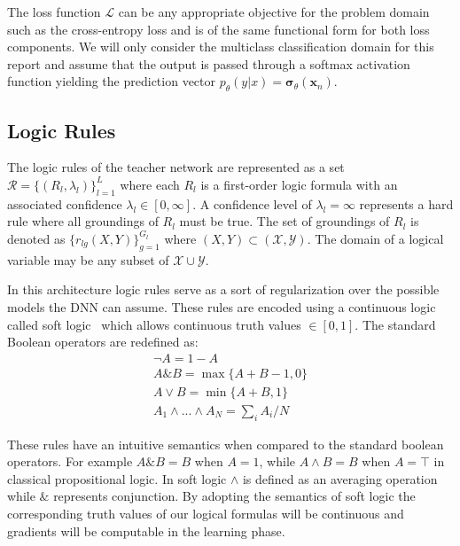 \documentclass[11pt]{article}
\begin{document}
The loss function $\mathcal{L}$ can be any appropriate objective for the problem domain such as the cross-entropy loss and is of the same functional form for both loss components.  We will only consider the multiclass classification domain for this report and assume that the output is passed through a softmax activation function yielding the prediction vector $p_\theta(y|x) = \boldsymbol{\sigma}_{\theta}(\textbf{x}_{n})$.

\subsection{Logic Rules}
The logic rules of the teacher network are represented as a set $\mathcal{R} = \{(R_l, \lambda_l) \}_{l = 1}^L$ where each $R_l$ is a first-order logic formula with an associated confidence $\lambda_l \in [0, \infty]$.  A confidence level of $\lambda_l = \infty$ represents a hard rule where all groundings of $R_l$ must be true.  The set of groundings of $R_l$ is denoted as $\{ r_{lg}(X, Y) \}_{g=1}^{G_l}$ where $(X, Y) \subset (\mathcal{X}, \mathcal{Y})$.  The domain of a logical variable may be any subset of $\mathcal{X} \cup \mathcal{Y}$.

In this architecture logic rules serve as a sort of regularization over the possible models the DNN can assume.  These rules are encoded using a continuous logic called soft logic~\cite{2015arXiv150504406B} which allows continuous truth values $\in [0, 1]$.  The standard Boolean operators are redefined as:
\begin{equation}
\begin{gathered}
\neg A = 1 - A\\
A \& B = \max\{A + B - 1, 0\}\\
A \lor B = \min\{A + B, 1\}\\
A_1 \land ... \land A_N = \sum_i A_i / N
\end{gathered}
\end{equation}

These rules have an intuitive semantics when compared to the standard boolean operators.  For example $A \& B = B$ when $A = 1$, while $A \land B = B$ when $A = \top$ in classical propositional logic.  In soft logic $\land$ is defined as an averaging operation while $\&$ represents conjunction.  By adopting the semantics of soft logic the corresponding truth values of our logical formulas will be continuous and gradients will be computable in the learning phase.
\end{document}

